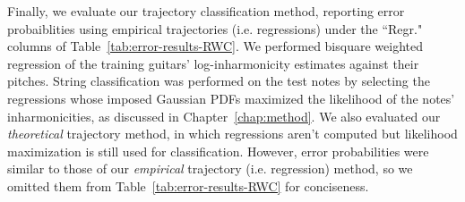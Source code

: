 \documentclass[12pt]{cmuthesis}
\begin{document}
Finally, we evaluate our trajectory classification method, reporting error probaiblities using empirical trajectories (i.e. regressions) under the ``Regr." columns of Table~\ref{tab:error-results-RWC}. We performed bisquare weighted regression of the training guitars' log-inharmonicity estimates against their pitches. String classification was performed on the test notes by selecting the regressions whose imposed Gaussian PDFs maximized the likelihood of the notes' inharmonicities, as discussed in Chapter~\ref{chap:method}. We also evaluated our \textit{theoretical} trajectory method, in which regressions aren't computed but likelihood maximization is still used for classification. However, error probabilities were similar to those of our \textit{empirical} trajectory (i.e. regression) method, so we omitted them from Table~\ref{tab:error-results-RWC} for conciseness.
\end{document}
